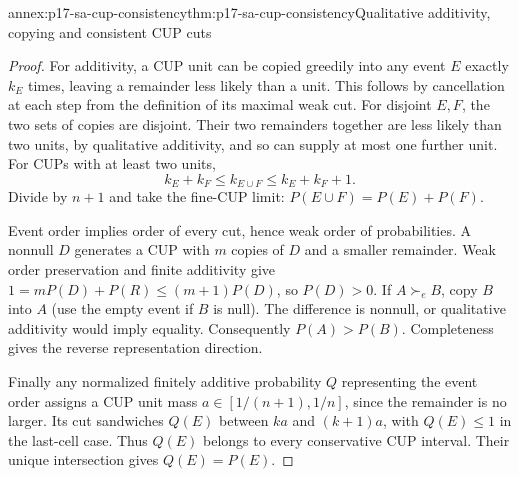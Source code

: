 \begin{annexitem}{annex:p17-sa-cup-consistency}{thm:p17-sa-cup-consistency}{Qualitative additivity, copying and consistent CUP cuts}
\begin{proof}
For additivity, a CUP unit can be copied greedily into any
event \(E\) exactly \(k_E\) times, leaving a remainder less
likely than a unit. This follows by cancellation at each
step from the definition of its maximal weak cut.
For disjoint \(E,F\), the two sets of copies are disjoint.
Their two remainders together are less likely than two
units, by qualitative additivity, and so can supply at most
one further unit. For CUPs with at least two units,
\[
 k_E+k_F\leq k_{E\cup F}\leq k_E+k_F+1.
\]
Divide by \(n+1\) and take the fine-CUP limit:
\(P(E\cup F)=P(E)+P(F)\).

Event order implies order of every cut, hence weak order
of probabilities. A nonnull \(D\) generates a CUP with
\(m\) copies of \(D\) and a smaller remainder. Weak order
preservation and finite additivity give
\(1=mP(D)+P(R)\leq(m+1)P(D)\), so \(P(D)>0\).
If \(A\succ_e B\), copy \(B\) into \(A\) (use the empty
event if \(B\) is null). The difference is nonnull,
or qualitative additivity would imply equality.
Consequently \(P(A)>P(B)\).
Completeness gives the reverse representation direction.

Finally any normalized finitely additive probability \(Q\)
representing the event order assigns a CUP unit mass
\(a\in[1/(n+1),1/n]\), since the remainder is no larger.
Its cut sandwiches \(Q(E)\) between \(ka\) and
\((k+1)a\), with \(Q(E)\leq1\) in the last-cell case.
Thus \(Q(E)\) belongs to every conservative CUP interval.
Their unique intersection gives \(Q(E)=P(E)\).
\end{proof}
\end{annexitem}

